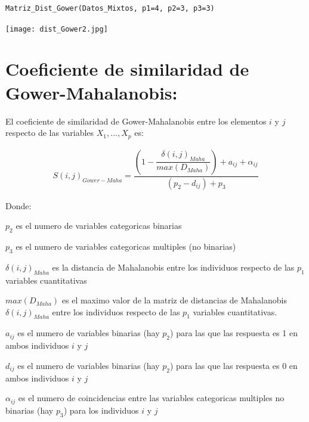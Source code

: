 \documentclass[12pt]{report} %
\begin{document}
 
 
\begin{lstlisting}
Matriz_Dist_Gower(Datos_Mixtos, p1=4, p2=3, p3=3)
\end{lstlisting}

\texttt{[image: dist\_Gower2.jpg]}



\newpage





\section{Coeficiente de similaridad de Gower-Mahalanobis:}

\begin{tcolorbox}[toptitle=2mm,title=  Coeficiente de similaridad de Gower-Mahalanobis:   ]

El coeficiente de similaridad de Gower-Mahalanobis entre los elementos $i$ y $j$ respecto de las variables $X_1,...,X_p$ es:

\begin{gather*}
S(i,j)_{Gower-Maha}=\dfrac{ \left(1- \dfrac{\delta(i,j)_{Maha}}{max(D_{Maha})} \right) + a_{ij} + \alpha_{ij} }{ (p_2 - d_{ij}) + p_3}
\end{gather*}

\end{tcolorbox}

Donde:

$p_2$ es el numero de variables categoricas binarias

$p_3$ es el numero de variables categoricas multiples (no binarias)

$\delta(i,j)_{Maha}$ es la distancia de Mahalanobis entre los individuos respecto de las $p_1$ variables cuantitativas

$max(D_{Maha})$ es el maximo valor de la matriz de distancias de Mahalanobis $\delta(i,j)_{Maha}$ entre los individuos respecto de las $p_1$ variables cuantitativas.

$a_{ij}$ es el numero de variables binarias (hay $p_2$) para las que las respuesta es 1 en ambos individuos $i$ y $j$

$d_{ij}$ es el numero de variables binarias (hay $p_2$) para las que las respuesta es 0 en ambos individuos $i$ y $j$

$\alpha_{ij}$ es el numero de coincidencias entre las variables categoricas multiples no binarias (hay $p_3$) para los individuos $i$ y $j$
\end{document}
